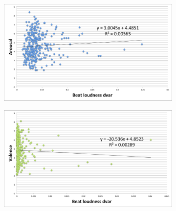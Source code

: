 \begin{figure}
	    \centering
        \begin{subfigure}[b]{0.48\textwidth}
                \includegraphics[width=\textwidth]{Figures/beatloudnessdvar-arousal}
			   \vspace{20pt}
        \end{subfigure}
        \begin{subfigure}[b]{0.48\textwidth}
                \includegraphics[width=\textwidth]{Figures/beatloudnessdvar-valence}
                  \vspace{20pt}
        \end{subfigure}        
        

\end{figure}

